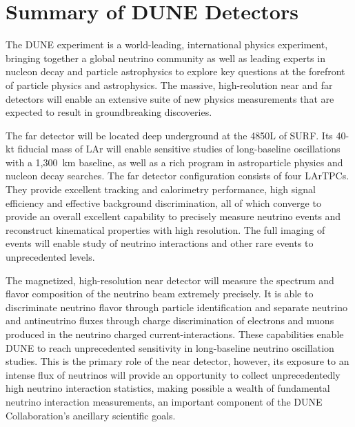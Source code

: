 \chapter{Summary of DUNE Detectors}
\label{ch:detectors-summary}

The DUNE experiment is a world-leading, international physics
experiment, bringing together a global neutrino community as well as
leading experts in nucleon decay and particle astrophysics to explore
key questions at the forefront of particle physics and
astrophysics. The massive, high-reolution near and far detectors will
enable an extensive suite of new physics measurements that are
expected to result in groundbreaking discoveries.

The far detector will be located deep underground at the 4850L of
SURF.  Its 40-kt fiducial mass of LAr will enable sensitive studies of
long-baseline oscillations with a 1,300~km baseline, as well as a rich
program in astroparticle physics and nucleon decay searches.  The far
detector configuration consists of four LArTPCs.  They provide
excellent tracking and calorimetry performance, high signal efficiency
and effective background discrimination, all of which converge to
provide an overall excellent capability to precisely measure neutrino
events and reconstruct kinematical properties with high
resolution. The full imaging of events will enable study of neutrino
interactions and other rare events to unprecedented levels.

The magnetized, high-resolution near detector will measure the
spectrum and flavor composition of the neutrino beam extremely
precisely. It is able to discriminate neutrino flavor through
particle identification and separate neutrino and antineutrino fluxes
through charge discrimination of electrons and muons produced in the
neutrino charged current-interactions. These capabilities  enable DUNE to
reach unprecedented sensitivity in long-baseline neutrino oscillation
studies.  This is the primary role of the near detector, however, its
exposure to an intense flux of neutrinos will provide an opportunity to
collect unprecedentedly high neutrino interaction statistics, making
possible a wealth of fundamental neutrino interaction measurements, an
important component of the DUNE Collaboration's ancillary scientific
goals.


